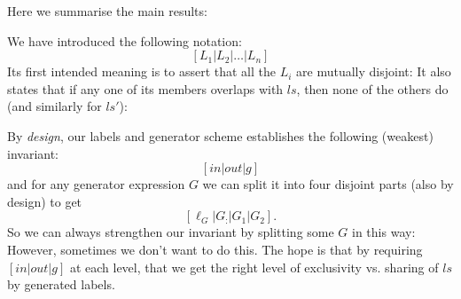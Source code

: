 Here we summarise the main results:



\newpage
{}

We have introduced the following notation:
\[
  [ L_1 | L_2 | \dots | L_n ]
\]
Its first intended meaning is to assert that
all the $L_i$ are mutually disjoint:
It also states that if any one of its members overlaps with $ls$,
then none of the others do (and similarly for $ls'$):

By \emph{design}, our labels and generator scheme
establishes the following (weakest) invariant:
\[ [in|out|g]\]
and for any generator expression $G$ we can split it into
four disjoint parts (also by design) to get
\[  [\ell_G|G_{:}|G_1|G_2] . \]
So we can always strengthen our invariant by splitting some $G$
in this way:
However, sometimes we don't want to do this.
The hope is that by requiring $[in|out|g]$ at each level,
that we get the right level of exclusivity vs. sharing of $ls$
by generated labels.

